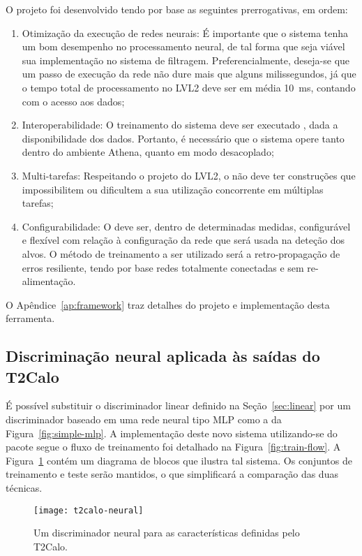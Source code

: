 O projeto foi desenvolvido tendo por base as seguintes prerrogativas, em
ordem:

\begin{enumerate}
\item Otimização da execução de redes neurais: É importante que o sistema
tenha um bom desempenho no processamento neural, de tal forma que seja viável
sua implementação no sistema de filtragem. Preferencialmente, deseja-se que um
passo de execução da rede não dure mais que alguns milissegundos, já que o
tempo total de processamento no LVL2 deve ser em média 10~ms, contando com o
acesso aos dados;
\item Interoperabilidade: O treinamento do sistema deve ser executado
, dada a disponibilidade dos dados. Portanto, é necessário que o
sistema opere tanto dentro do ambiente Athena, quanto em modo desacoplado;
\item Multi-tarefas: Respeitando o projeto do LVL2, o  não
deve ter construções que impossibilitem ou dificultem a sua utilização
concorrente em múltiplas tarefas;
\item Configurabilidade: O  deve ser, dentro de determinadas
medidas, configurável e flexível com relação à configuração da rede que será
usada na deteção dos alvos. O método de treinamento a ser utilizado será a
retro-propagação de erros resiliente, tendo por base redes totalmente
conectadas e sem re-alimentação.
\end{enumerate}

O Apêndice~\ref{ap:framework} traz detalhes do projeto e implementação
desta ferramenta.

\subsection{Discriminação neural aplicada às saídas do T2Calo}

É possível substituir o discriminador linear definido na
Seção~\ref{sec:linear} por um discriminador baseado em uma rede neural tipo
MLP como a da Figura~\ref{fig:simple-mlp}. A implementação deste novo sistema
utilizando-se do pacote  segue o fluxo de treinamento foi
detalhado na Figura~\ref{fig:train-flow}. A Figura~\ref{fig:t2calo-neural}
contém um diagrama de blocos que ilustra tal sistema. Os conjuntos de
treinamento e teste serão mantidos, o que simplificará a comparação das duas
técnicas.

\begin{figure}
\begin{center}
\texttt{[image: t2calo-neural]}
\end{center}
\caption{Um discriminador neural para as características definidas pelo
T2Calo.}
\label{fig:t2calo-neural}
\end{figure}

